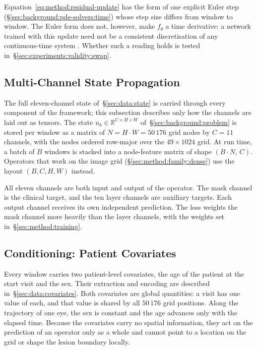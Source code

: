 Equation~\eqref{eq:method:residual-update} has the form of one explicit
Euler step (\S\ref{sec:background:pde-solvers:time}) whose step size
differs from window to window. The Euler form does not, however, make $f_\theta$ a
time derivative: a network trained with this update need not be a
consistent discretisation of any continuous-time system \citep{Ott2021}.
Whether such a reading holds is tested
in~\S\ref{sec:experiments:validity:swap}.

\subsection{Multi-Channel State Propagation}
\label{sec:method:multichannel}

The full eleven-channel state of~\S\ref{sec:data:state} is carried through
every component of the framework; this subsection describes only how the
channels are laid out as tensors. The state
$u_k \in \mathbb{R}^{C \times H \times W}$ of~\S\ref{sec:background:problem}
is stored per window as a matrix of $N = H \cdot W = 50\,176$ grid nodes by
$C = 11$ channels, with the nodes ordered row-major over the
$49 \times 1024$ grid. At run time, a batch of $B$ windows is stacked into
a node-feature matrix of shape $(B \cdot N,\, C)$. Operators that work on
the image grid (\S\ref{sec:method:family:dense}) use the layout
$(B, C, H, W)$ instead.

All eleven channels are both input and output of the operator. The mask
channel is the clinical target, and the ten layer channels are auxiliary
targets. Each output channel receives its own independent prediction. The
loss weights the mask channel more heavily than the layer channels, with
the weights set in~\S\ref{sec:method:training}.


\subsection{Conditioning: Patient Covariates}
\label{sec:method:covariates}

Every window carries two patient-level covariates, the age of the patient
at the start visit and the sex. Their extraction and encoding are described
in~\S\ref{sec:data:covariates}. Both covariates are global quantities: a
visit has one value of each, and that value is shared by all $50\,176$
grid positions. Along the trajectory of one eye, the sex is constant and
the age advances only with the elapsed time. Because the covariates carry
no spatial information, they act on the prediction of an operator only as
a whole and cannot point to a location on the grid or shape the lesion
boundary locally.

